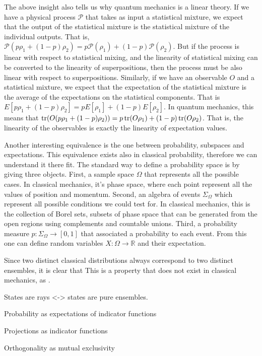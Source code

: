 The above insight also tells us why quantum mechanics is a linear theory. If we have a physical process $\mathcal{P}$ that takes as input a statistical mixture, we expect that the output of the statistical mixture is the statistical mixture of the individual outputs. That is, $\mathcal{P}(p\rho_1 + (1-p) \rho_2) = p \mathcal{P}(\rho_1) + (1-p) \mathcal{P}(\rho_2)$. But if the process is linear with respect to statistical mixing, and the linearity of statistical mixing can be converted to the linearity of superpositions, then the process must be also linear with respect to superpositions. Similarly, if we have an observable $O$ and a statistical mixture, we expect that the expectation of the statistical mixture is the average of the expectations on the statistical components. That is $E[p\rho_1 + (1-p) \rho_2] = pE[\rho_1] + (1-p) E[\rho_2]$. In quantum mechanics, this means that $\operatorname{tr}(O(p\rho_1 + (1-p) \rho_2)) = p\operatorname{tr}(O\rho_1) + (1-p) \operatorname{tr}(O\rho_2)$. That is, the linearity of the observables is exactly the linearity of expectation values.

Another interesting equivalence is the one between probability, subspaces and expectations. This equivalence exists also in classical probability, therefore we can understand it there fit. The standard way to define a probability space is by giving three objects. First, a sample space $\Omega$ that represents all the possible cases. In classical mechanics, it's phase space, where each point represent all the values of position and momentum. Second, an algebra of events $\Sigma_{\Omega}$ which represent all possible conditions we could test for. In classical mechanics, this is the collection of Borel sets, subsets of phase space that can be generated from the open regions using complements and countable unions. Third, a probability measure $p : \Sigma_{\Omega} \to [0,1]$ that associated a probability to each event. From this one can define random variables $X : \Omega \to \mathbb{R}$ and their expectation.




Since two distinct classical distributions always correspond to two distinct ensembles, it is clear that  This is a property that does not exist in classical mechanics, as .

States are rays <-> states are pure ensembles.

Probability as expectations of indicator functions

Projections as indicator functions

Orthogonality as mutual exclusivity

